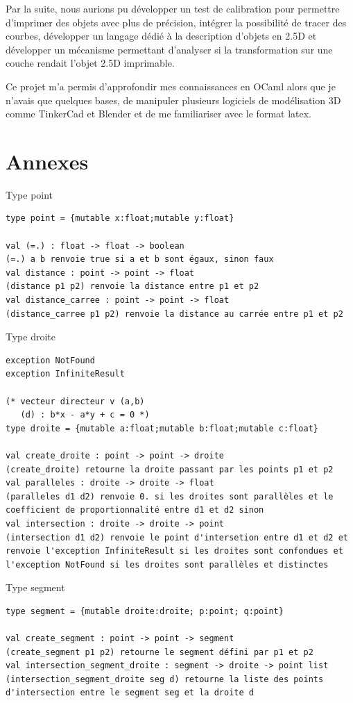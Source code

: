 \documentclass[11pt, titlepage]{article}
\begin{document}
Par la suite, nous aurions pu développer un test de calibration pour permettre d'imprimer des objets avec plus de précision, intégrer la possibilité de tracer des courbes, développer un langage dédié à la description d'objets en 2.5D et développer un mécanisme permettant d'analyser si la transformation sur une couche rendait l'objet 2.5D imprimable.

Ce projet m'a permis d'approfondir mes connaissances en OCaml alors que je n'avais que quelques bases, de manipuler plusieurs logiciels de modélisation 3D comme TinkerCad et Blender et de me familiariser avec le format latex.

\newpage
\section{Annexes}
Type point
\begin{lstlisting}
type point = {mutable x:float;mutable y:float}

val (=.) : float -> float -> boolean
(=.) a b renvoie true si a et b sont égaux, sinon faux       
val distance : point -> point -> float
(distance p1 p2) renvoie la distance entre p1 et p2
val distance_carree : point -> point -> float
(distance_carree p1 p2) renvoie la distance au carrée entre p1 et p2
\end{lstlisting}

\newline
Type droite
\begin{lstlisting}
exception NotFound
exception InfiniteResult

(* vecteur directeur v (a,b)
   (d) : b*x - a*y + c = 0 *)
type droite = {mutable a:float;mutable b:float;mutable c:float}

val create_droite : point -> point -> droite
(create_droite) retourne la droite passant par les points p1 et p2
val paralleles : droite -> droite -> float
(paralleles d1 d2) renvoie 0. si les droites sont parallèles et le coefficient de proportionnalité entre d1 et d2 sinon
val intersection : droite -> droite -> point
(intersection d1 d2) renvoie le point d'intersetion entre d1 et d2 et renvoie l'exception InfiniteResult si les droites sont confondues et l'exception NotFound si les droites sont parallèles et distinctes
\end{lstlisting}

\newline
Type segment
\begin{lstlisting}
type segment = {mutable droite:droite; p:point; q:point}

val create_segment : point -> point -> segment
(create_segment p1 p2) retourne le segment défini par p1 et p2
val intersection_segment_droite : segment -> droite -> point list
(intersection_segment_droite seg d) retourne la liste des points d'intersection entre le segment seg et la droite d
\end{lstlisting}
\end{document}
